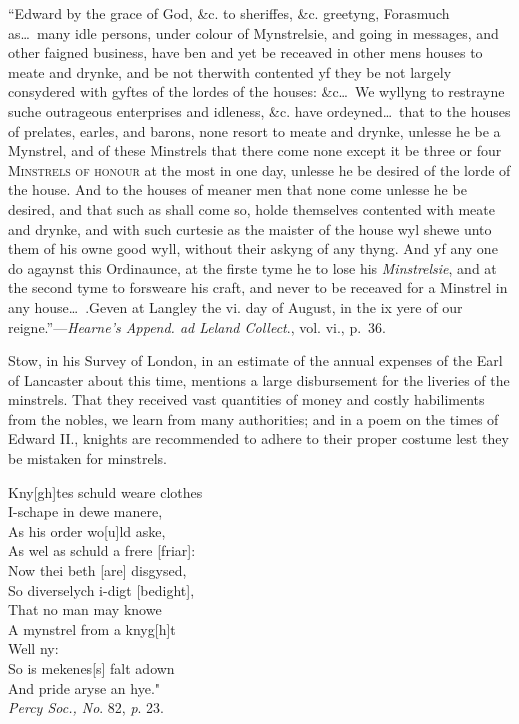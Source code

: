 “Edward by the grace of God, \&c. to sheriffes, \&c. greetyng, Forasmuch as\ldots\   many
idle persons, under colour of Mynstrelsie, and going in messages, and other faigned
business, have ben and yet be receaved in other mens houses to meate and drynke, and
be not therwith contented yf they be not largely consydered with gyftes of the lordes
of the houses: \&c\ldots\  We wyllyng to restrayne suche outrageous enterprises and idleness,
\&c. have ordeyned\ldots\  that to the houses of prelates, earles, and barons, none
resort to meate and drynke, unlesse he be a Mynstrel, and of these Minstrels that there
come none except it be three or four \textsc{Minstrels of honour} at the most in one day,
unlesse he be desired of the lorde of the house. \pagebreak
And to the houses of meaner men 
that none come unlesse he be desired, and that such as shall come so, holde themselves
contented with meate and drynke, and with such curtesie as the maister of the house
wyl shewe unto them of his owne good wyll, without their askyng of any thyng.
And yf any one do agaynst this Ordinaunce, at the firste tyme he to lose his \textit{Minstrelsie},
and at the second tyme to forsweare his craft, and never to be receaved for
a Minstrel in any house\ldots\  .Geven at Langley the vi. day of August, in the ix yere of
our reigne.”—\textit{Hearne’s Append. ad Leland Collect}., vol. vi., p.~36.

Stow, in his Survey of London, in an estimate of the annual expenses of
the Earl of Lancaster about this time, mentions a large disbursement for the
liveries of the minstrels. That they received vast quantities of money and costly
habiliments from the nobles, we learn from many authorities; and in a poem on
the times of Edward II., knights are recommended to adhere to their proper
costume lest they be mistaken for minstrels.

\settowidth{\versewidth}{“Kny[gh]tes schuld weare clothes}
\begin{dcverse}
\begin{patverse}
Kny[gh]tes schuld weare clothes\\
I-schape in dewe manere,\\
As his order wo[u]ld aske,\\
As wel as schuld a frere [friar]:\\
Now thei beth [are] disgysed,\\
So diverselych i-digt [bedight],\\
That no man may knowe\\
A mynstrel from a knyg[h]t\\
Well ny:\\
So is mekenes[s] falt adown\\
And pride aryse an hye."\\
\textit{Percy Soc., No}. 82, \textit{p}. 23.
\end{patverse}
\end{dcverse}

